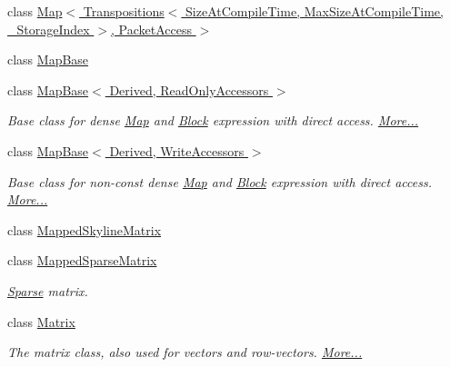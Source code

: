 \begin{DoxyCompactItemize}
class \hyperlink{class_eigen_1_1_map_3_01_transpositions_3_01_size_at_compile_time_00_01_max_size_at_compile_timecc993082d7c0ba51ca94b27e97da8dd3}{Map$<$ Transpositions$<$ Size\+At\+Compile\+Time, Max\+Size\+At\+Compile\+Time, \+\_\+\+Storage\+Index $>$, Packet\+Access $>$}
\item 
class \hyperlink{class_eigen_1_1_map_base}{Map\+Base}
\item 
class \hyperlink{group___core___module_class_eigen_1_1_map_base_3_01_derived_00_01_read_only_accessors_01_4}{Map\+Base$<$ Derived, Read\+Only\+Accessors $>$}
\begin{DoxyCompactList}\small\item\em Base class for dense \hyperlink{group___core___module_class_eigen_1_1_map}{Map} and \hyperlink{group___core___module_class_eigen_1_1_block}{Block} expression with direct access.  \hyperlink{group___core___module_class_eigen_1_1_map_base_3_01_derived_00_01_read_only_accessors_01_4}{More...}\end{DoxyCompactList}\item 
class \hyperlink{group___core___module_class_eigen_1_1_map_base_3_01_derived_00_01_write_accessors_01_4}{Map\+Base$<$ Derived, Write\+Accessors $>$}
\begin{DoxyCompactList}\small\item\em Base class for non-\/const dense \hyperlink{group___core___module_class_eigen_1_1_map}{Map} and \hyperlink{group___core___module_class_eigen_1_1_block}{Block} expression with direct access.  \hyperlink{group___core___module_class_eigen_1_1_map_base_3_01_derived_00_01_write_accessors_01_4}{More...}\end{DoxyCompactList}\item 
class \hyperlink{class_eigen_1_1_mapped_skyline_matrix}{Mapped\+Skyline\+Matrix}
\item 
class \hyperlink{class_eigen_1_1_mapped_sparse_matrix}{Mapped\+Sparse\+Matrix}
\begin{DoxyCompactList}\small\item\em \hyperlink{struct_eigen_1_1_sparse}{Sparse} matrix. \end{DoxyCompactList}\item 
class \hyperlink{group___core___module_class_eigen_1_1_matrix}{Matrix}
\begin{DoxyCompactList}\small\item\em The matrix class, also used for vectors and row-\/vectors.  \hyperlink{group___core___module_class_eigen_1_1_matrix}{More...}\end{DoxyCompactList}\item 

\end{DoxyCompactItemize}
